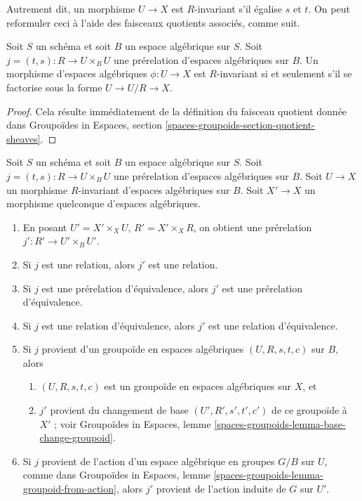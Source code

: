 \noindent
Autrement dit, un morphisme $U \to X$ est $R$-invariant s'il égalise
$s$ et $t$. On peut reformuler ceci à l'aide des faisceaux quotients
associés, comme suit.

\begin{lemma}
\label{lemma-invariant}
Soit $S$ un schéma et soit $B$ un espace algébrique sur $S$.
Soit $j = (t, s) : R \to U \times_B U$ une prérelation d'espaces
algébriques sur $B$. Un morphisme d'espaces algébriques $\phi : U \to X$ est
$R$-invariant si et seulement s'il se factorise sous la forme
$U \to U/R \to X$.
\end{lemma}

\begin{proof}
Cela résulte immédiatement de la définition du faisceau quotient donnée dans
Groupoïdes in Espaces, section \ref{spaces-groupoids-section-quotient-sheaves}.
\end{proof}

\begin{lemma}
\label{lemma-base-change-on-invariant}
Soit $S$ un schéma et soit $B$ un espace algébrique sur $S$.
Soit $j = (t, s) : R \to U \times_B U$ une prérelation d'espaces
algébriques sur $B$. Soit $U \to X$ un morphisme $R$-invariant d'espaces
algébriques sur $B$. Soit $X' \to X$ un morphisme quelconque d'espaces algébriques.
\begin{enumerate}
\item En posant $U' = X' \times_X U$, $R' = X' \times_X R$, on obtient
une prérelation $j' : R' \to U' \times_B U'$.
\item Si $j$ est une relation, alors $j'$ est une relation.
\item Si $j$ est une prérelation d'équivalence, alors $j'$ est une
prérelation d'équivalence.
\item Si $j$ est une relation d'équivalence, alors $j'$ est une relation
d'équivalence.
\item Si $j$ provient d'un groupoïde en espaces algébriques
$(U, R, s, t, c)$ sur $B$, alors
\begin{enumerate}
\item $(U, R, s, t, c)$ est un groupoïde en espaces algébriques sur $X$, et
\item $j'$ provient du changement de base $(U', R', s', t', c')$
de ce groupoïde à $X'$ ; voir
Groupoïdes in Espaces, lemme
\ref{spaces-groupoids-lemma-base-change-groupoid}.
\end{enumerate}
\item Si $j$ provient de l'action d'un espace algébrique en groupes $G/B$ sur $U$,
comme dans Groupoïdes in Espaces, lemme
\ref{spaces-groupoids-lemma-groupoid-from-action},
alors $j'$ provient de l'action induite de $G$ sur $U'$.
\end{enumerate}
\end{lemma}

